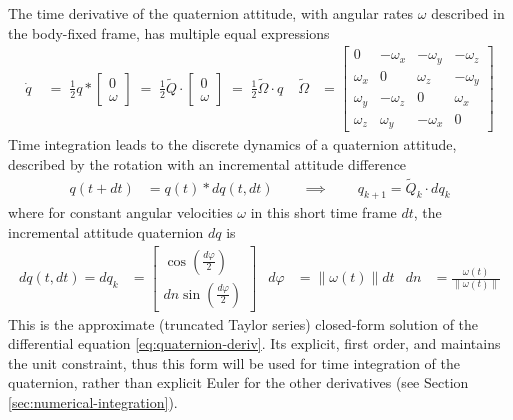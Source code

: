 The time derivative of the quaternion attitude, with angular rates $\omega$ described in the body-fixed frame, has multiple equal expressions \cite{zipfel2007, sola2017, stevens2015}
\begin{align}
    \dot q \;
    &= \; \frac{1}{2} q * \begin{bmatrix}
        0 \\ \omega
    \end{bmatrix} \;
    = \; \frac{1}{2} \tilde Q \cdot \begin{bmatrix}
        0 \\ \omega
    \end{bmatrix} \;
    = \; \frac{1}{2} \tilde \Omega \cdot q \;
    & 
    \tilde \Omega &= \begin{bmatrix}
        0 & -\omega_x & -\omega_y & -\omega_z \\
        \omega_x & 0 & \omega_z & -\omega_y \\
        \omega_y & -\omega_z & 0 & \omega_x \\
        \omega_z & \omega_y & -\omega_x & 0
    \end{bmatrix}    
    \label{eq:quaternion-deriv}
\end{align}
Time integration leads to the discrete dynamics of a quaternion attitude, described by the rotation with an incremental attitude difference \cite{sola2017, stevens2015} 
\begin{align}
    q(t + dt) &= q(t) * dq(t,dt) 
    \qquad \implies
    \qquad q_{k+1} = \tilde Q_k \cdot dq_k
    \label{eq:quaternion-update}
\end{align}
where for constant angular velocities $\omega$ in this short time frame $dt$, the incremental attitude quaternion $dq$ is \cite{sola2017}
\begin{align}
    dq(t, dt) = dq_k &= \begin{bmatrix} \cos(\frac{d\varphi}{2}) \\ dn \sin(\frac{d\varphi}{2})
    \end{bmatrix}
    & d\varphi &= \lVert \omega(t) \rVert dt 
    & dn &= \frac{\omega(t)}{\lVert \omega(t) \rVert}
    \label{eq:quaternion-increment}
\end{align}
This is the approximate (truncated Taylor series) closed-form solution of the differential equation \ref{eq:quaternion-deriv}.
Its explicit, first order, and maintains the unit constraint, thus this form will be used for time integration of the quaternion, rather than explicit Euler for the other derivatives (see Section \ref{sec:numerical-integration}).

